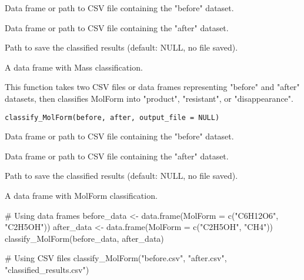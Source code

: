\documentclass[a4paper]{book}
\begin{document}
%
\begin{Arguments}
\begin{ldescription}
\item[\code{before}] Data frame or path to CSV file containing the "before" dataset.

\item[\code{after}] Data frame or path to CSV file containing the "after" dataset.

\item[\code{output\_file}] Path to save the classified results (default: NULL, no file saved).
\end{ldescription}
\end{Arguments}
%
\begin{Value}
A data frame with Mass classification.
\end{Value}
%
\begin{Description}
This function takes two CSV files or data frames representing "before" and "after" datasets,
then classifies MolForm into "product", "resistant", or "disappearance".
\end{Description}
%
\begin{Usage}
\begin{verbatim}
classify_MolForm(before, after, output_file = NULL)
\end{verbatim}
\end{Usage}
%
\begin{Arguments}
\begin{ldescription}
\item[\code{before}] Data frame or path to CSV file containing the "before" dataset.

\item[\code{after}] Data frame or path to CSV file containing the "after" dataset.

\item[\code{output\_file}] Path to save the classified results (default: NULL, no file saved).
\end{ldescription}
\end{Arguments}
%
\begin{Value}
A data frame with MolForm classification.
\end{Value}
%
\begin{Examples}
\begin{ExampleCode}
# Using data frames
before_data <- data.frame(MolForm = c("C6H12O6", "C2H5OH"))
after_data <- data.frame(MolForm = c("C2H5OH", "CH4"))
classify_MolForm(before_data, after_data)

# Using CSV files
classify_MolForm("before.csv", "after.csv", "classified_results.csv")
\end{ExampleCode}
\end{Examples}
\end{document}
